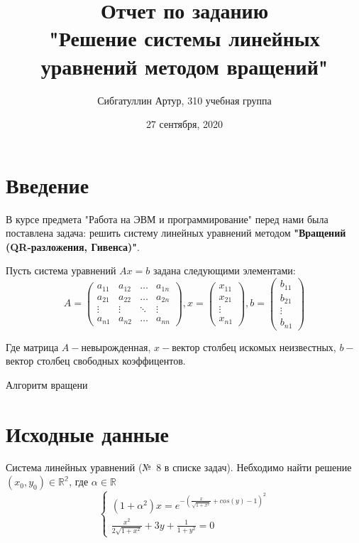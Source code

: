 \documentclass[a4paper, fontsize=14pt]{article}
\title{\textbf{Отчет по заданию \\"Решение системы линейных уравнений методом вращений"}}
\author{Сибгатуллин Артур, 310 учебная группа}
\date{27 сентября, 2020}
\begin{document}
        \maketitle

    \newpage
        \tableofcontents

        \newpage
	\section{Введение}
		 В курсе предмета "Работа на ЭВМ и программирование" перед нами была поставлена задача: решить систему линейных уравнений методом \textbf{"Вращений (QR-разложения, Гивенса)"}.
		 
		 Пусть система уравнений $Ax = b $ задана следующими элементами:
		 \begin{equation*}
			 	A = \left(
			 	\begin{array}{cccc}
			 		a_{11} & a_{12} & \ldots & a_{1n}\\
			 		a_{21} & a_{22} & \ldots & a_{2n}\\
			 		\vdots & \vdots & \ddots & \vdots\\
			 		a_{n1} & a_{n2} & \ldots & a_{nn}
			 	\end{array}
			 	\right), 
			 	x = \left(
			 	\begin{array}{cccc}
			 		x_{11} \\
			 		x_{21} \\
			 		\vdots \\
			 		x_{n1} 
			 	\end{array}
			 	\right),	
			 	b = \left(
			 	\begin{array}{cccc}
			 		b_{11} \\
			 		b_{21} \\
			 		\vdots \\
			 		b_{n1} 
			 	\end{array}
			 	\right)
	 	\end{equation*}
 	
 	
		Где матрица $A-$невырожденная, $x-$вектор столбец искомых неизвестных, $b-$вектор столбец свободных коэффицентов.
		
		Алгоритм вращени
	 	
 	

         \section{Исходные данные}
	    Система линейных уравнений (№\ 8 в списке задач). Небходимо найти решение $(x_0,y_0) \in \mathbb{R^2}$, где $\alpha \in \mathbb{R}$
	\begin{equation*}
	    \begin{cases}
	        (1+\alpha^2)x = e^{-(\frac{x}{\sqrt{1+x^2}} + cos(y) -1)^2}\\
		\frac{x^2}{2\sqrt{1+x^2}} +3y + \frac{1}{1+y^2} = 0
		\end{cases}
	\end{equation*}
\end{document}
